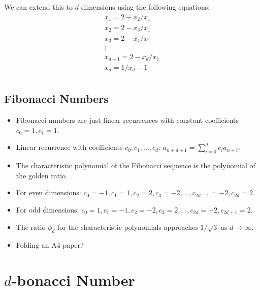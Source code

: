 \documentclass[english,version-2020-11]{uzl-thesis}
\begin{document}
We can extend this to $d$ dimensions using the following equations:
\begin{align*}
  x_1 = 2 - x_2 / x_1 \\
  x_2 = 2 - x_3 / x_1 \\
  x_3 = 2 - x_4 / x_1 \\
  \vdots \\
  x_{d-1} = 2 - x_d / x_1 \\
  x_d = 1 / x_d - 1 \\
\end{align*}


\section{Fibonacci Numbers}

\begin{itemize}
  \item Fibonacci numbers are just linear recurrences with constant coefficients $c_0 = 1, c_1 = 1$.
  \item Linear recurrence with coefficients $c_0, c_1, \dots, c_d$: $a_{n+d+1} = \sum_{i=0}^d c_i a_{n+i}$.
  \item The characteristic polynomial of the Fibonacci sequence is the polynomial of the golden ratio.
  \item For even dimensions: $c_0 = -1, c_1 = 1, c_2 = 2, c_3 = -2, \dots, c_{2d-1} = -2, c_{2d} = 2$.
  \item For odd dimensions:  $c_0 = 1, c_1 = -1, c_2 = -2, c_3 = 2, \dots, c_{2d} = -2, c_{2d+1} = 2$.
  \item The ratio $\phi_d$ for the characteristic polynomials approaches $1/\sqrt{3}$ as $d \to \infty$.
  \item Folding an A4 paper?
\end{itemize}

\chapter{$d$-bonacci Number}
\end{document}
